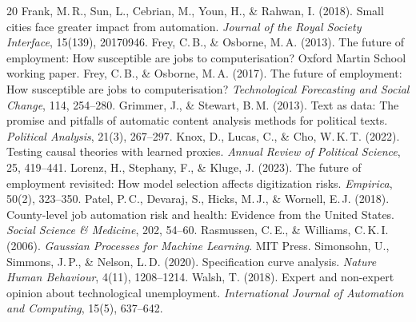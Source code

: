 \documentclass[11pt]{article}
\begin{document}
\begin{thebibliography}{20}
 Frank, M.\,R., Sun, L., Cebrian, M., Youn, H., \& Rahwan, I.
  (2018). Small cities face greater impact from automation. \emph{Journal of the Royal Society
  Interface}, 15(139), 20170946.
 Frey, C.\,B., \& Osborne, M.\,A. (2013). The future of
  employment: How susceptible are jobs to computerisation? Oxford Martin School working paper.
 Frey, C.\,B., \& Osborne, M.\,A. (2017). The future of
  employment: How susceptible are jobs to computerisation? \emph{Technological Forecasting and Social
  Change}, 114, 254--280.
 Grimmer, J., \& Stewart, B.\,M. (2013). Text as data: The
  promise and pitfalls of automatic content analysis methods for political texts. \emph{Political
  Analysis}, 21(3), 267--297.
 Knox, D., Lucas, C., \& Cho, W.\,K.\,T. (2022). Testing causal
  theories with learned proxies. \emph{Annual Review of Political Science}, 25, 419--441.
 Lorenz, H., Stephany, F., \& Kluge, J. (2023). The future of
  employment revisited: How model selection affects digitization risks. \emph{Empirica}, 50(2),
  323--350.
 Patel, P.\,C., Devaraj, S., Hicks, M.\,J., \& Wornell, E.\,J.
  (2018). County-level job automation risk and health: Evidence from the United States. \emph{Social
  Science \& Medicine}, 202, 54--60.
 Rasmussen, C.\,E., \& Williams, C.\,K.\,I. (2006).
  \emph{Gaussian Processes for Machine Learning}. MIT Press.
 Simonsohn, U., Simmons, J.\,P., \& Nelson, L.\,D. (2020).
  Specification curve analysis. \emph{Nature Human Behaviour}, 4(11), 1208--1214.
 Walsh, T. (2018). Expert and non-expert opinion about technological
  unemployment. \emph{International Journal of Automation and Computing}, 15(5), 637--642.
\end{thebibliography}
\endgroup
\end{document}
